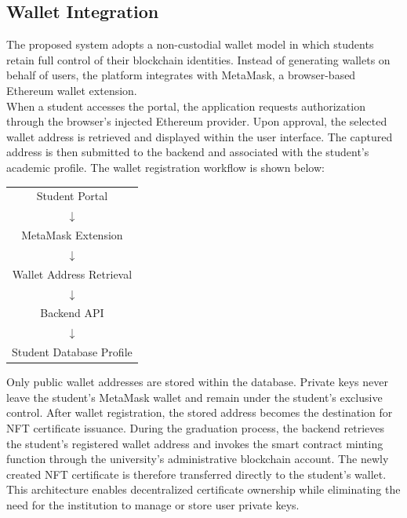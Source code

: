 \subsection{Wallet Integration}

The proposed system adopts a non-custodial wallet model in which students retain full control of their blockchain identities. Instead of generating wallets on behalf of users, the platform integrates with MetaMask, a browser-based Ethereum wallet extension.\\

When a student accesses the portal, the application requests authorization through the browser's injected Ethereum provider. Upon approval, the selected wallet address is retrieved and displayed within the user interface. The captured address is then submitted to the backend and associated with the student's academic profile. The wallet registration workflow is shown below:

\begin{center}
    \begin{tabular}{c}
        Student Portal           \\
        $\downarrow$             \\
        MetaMask Extension       \\
        $\downarrow$             \\
        Wallet Address Retrieval \\
        $\downarrow$             \\
        Backend API              \\
        $\downarrow$             \\
        Student Database Profile
    \end{tabular}
\end{center}

Only public wallet addresses are stored within the database. Private keys never leave the student's MetaMask wallet and remain under the student's exclusive control. After wallet registration, the stored address becomes the destination for NFT certificate issuance. During the graduation process, the backend retrieves the student's registered wallet address and invokes the smart contract minting function through the university's administrative blockchain account. The newly created NFT certificate is therefore transferred directly to the student's wallet. This architecture enables decentralized certificate ownership while eliminating the need for the institution to manage or store user private keys.
